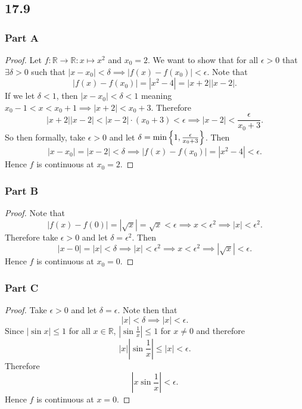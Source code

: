 \documentclass[12pt,titlepage]{extarticle}
\begin{document}
\subsection*{17.9}
\subsubsection*{Part A}
\begin{proof}
    Let $f : \mathbb{R} \to \mathbb{R} : x \mapsto x^2$ and $x_0 = 2$. We want to show that for all $\epsilon > 0$ that $\exists \delta > 0$ such that $|x - x_0| < \delta \implies |f(x) - f(x_0)| < \epsilon$. Note that
    \[
        |f(x) - f(x_0)| = |x^2 - 4| = |x+2||x-2|
    .\]
    If we let $\delta < 1$, then $|x - x_0| < \delta < 1$ meaning $x_0 - 1 < x < x_0 + 1 \implies |x+2| < x_0 + 3$. Therefore
    \[
        |x+2||x-2| < |x-2| \cdot (x_0 + 3) < \epsilon \implies |x-2| < \frac{\epsilon}{x_0+3}
    .\]
    So then formally, take $\epsilon > 0$ and let $\delta = \min\qty{1, \frac{\epsilon}{x_0 + 3}}$. Then
    \[
        |x-x_0| = |x-2| < \delta \implies |f(x) - f(x_0)| = |x^2 - 4| < \epsilon
    .\]
    Hence $f$ is continuous at $x_0 = 2$.
\end{proof}

\subsubsection*{Part B}
\begin{proof}
    Note that
    \[
        |f(x) - f(0)| = |\sqrt{x}| = \sqrt{x} < \epsilon \implies x < \epsilon^2 \implies |x| < \epsilon^2
    .\]
    Therefore take $\epsilon > 0$ and let $\delta = \epsilon^2$. Then
    \[
        |x-0| = |x| < \delta \implies |x| < \epsilon^2 \implies x < \epsilon^2 \implies |\sqrt{x}| < \epsilon
    .\]
    Hence $f$ is continuous at $x_0 = 0$.
\end{proof}

\subsubsection*{Part C}
\begin{proof}
    Take $\epsilon > 0$ and let $\delta = \epsilon$. Note then that
    \[
        |x| < \delta \implies |x| < \epsilon
    .\]
    Since $|\sin x| \leq 1$ for all $x \in \mathbb{R}$, $|\sin \frac{1}{x}| \leq 1$ for $x \neq 0$ and therefore
    \[
        |x||\sin \frac{1}{x}| \leq |x| < \epsilon
    .\]
    Therefore
    \[
        |x \sin \frac{1}{x}| < \epsilon
    .\]
    Hence $f$ is continuous at $x = 0$.
\end{proof}
\end{document}
